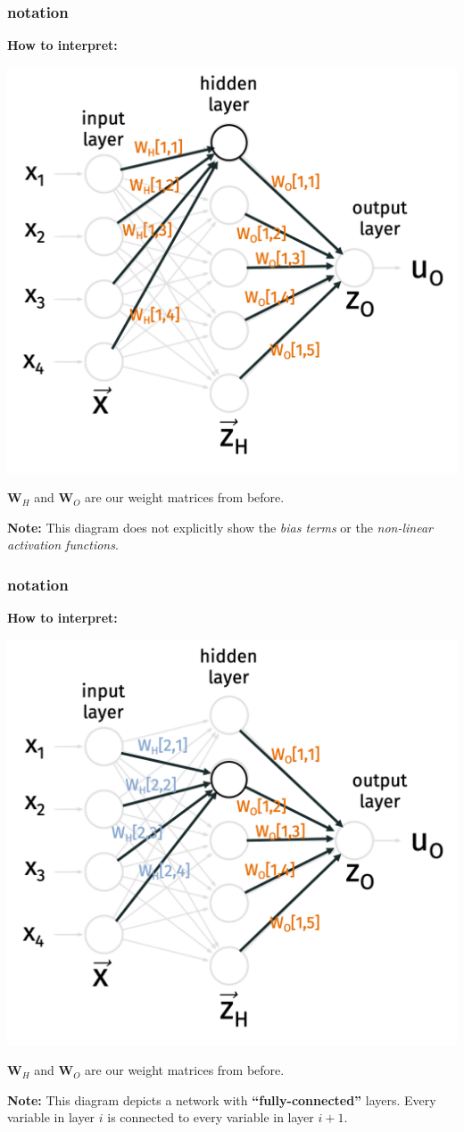 \documentclass[handout,compress]{beamer}
\newcommand{\bv}[1]{\mathbf{#1}}
\begin{document}
\begin{frame}
	\frametitle{notation}
	\textbf{How to interpret:}
	\vspace{-1em}
	\begin{center}
		\includegraphics[width=.6\textwidth]{weights1.png}
	\end{center}
\vspace{-1.5em}
$\bv{W}_H$ and $\bv{W}_O$ are our weight matrices from before. 

\textbf{Note:} This diagram does not explicitly show the \emph{bias terms} or the \emph{non-linear activation functions}. 
\end{frame}

\begin{frame}
	\frametitle{notation}
	\textbf{How to interpret:}
	\vspace{-1em}
	\begin{center}
		\includegraphics[width=.6\textwidth]{weights2.png}
	\end{center}
\vspace{-1.5em}
$\bv{W}_H$ and $\bv{W}_O$ are our weight matrices from before. 

\small{
\textbf{Note:} This diagram depicts a network with \textbf{``fully-connected''} layers. Every variable in layer $i$ is connected to every variable in layer $i + 1$.}
\end{frame}
\end{document}
